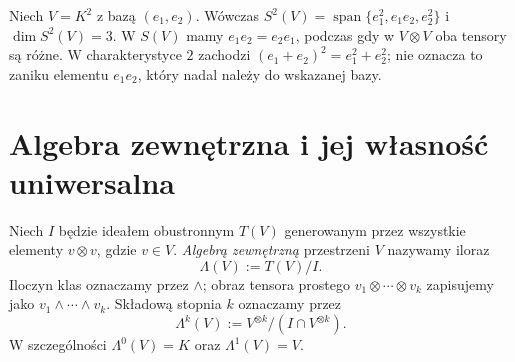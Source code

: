 \begin{przyklad}
\label{prz:lin10-sym2}
Niech \(V=K^2\) z bazą \((e_1,e_2)\).
Wówczas
\(S^2(V)=\operatorname{span}
 \{e_1^2,e_1e_2,e_2^2\}\)
i \(\dim S^2(V)=3\).
W \(S(V)\) mamy \(e_1e_2=e_2e_1\),
podczas gdy w \(V\otimes V\)
oba tensory są różne.
W charakterystyce \(2\)
zachodzi \((e_1+e_2)^2=e_1^2+e_2^2\);
nie oznacza to zaniku
elementu \(e_1e_2\), który
nadal należy do wskazanej bazy.
\end{przyklad}


\section{Algebra zewnętrzna i jej własność uniwersalna}
\label{sec:lin10-zewnetrzna}

\begin{definicja}
\label{def:lin10-zewnetrzna}
Niech \(I\) będzie ideałem
obustronnym \(T(V)\) generowanym przez
wszystkie elementy \(v\otimes v\),
gdzie \(v\in V\).
\emph{Algebrą zewnętrzną} przestrzeni \(V\)
nazywamy iloraz
\[
 \Lambda(V):=T(V)/I.
\]
Iloczyn klas oznaczamy przez \(\wedge\);
obraz tensora prostego
\(v_1\otimes\cdots\otimes v_k\)
zapisujemy jako
\(v_1\wedge\cdots\wedge v_k\).
Składową stopnia \(k\) oznaczamy przez
\[
 \Lambda^k(V):=
 V^{\otimes k}/(I\cap V^{\otimes k}).
\]
W szczególności
\(\Lambda^0(V)=K\) oraz \(\Lambda^1(V)=V\).
\end{definicja}

